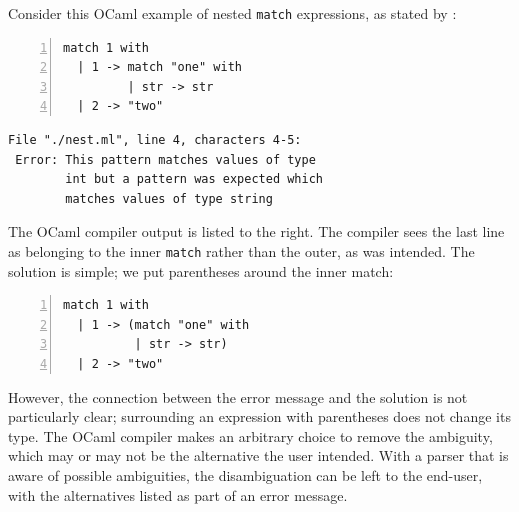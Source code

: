 \documentclass[runningheads]{llncs}
\newcommand{\ocaml}{\lstinline[language={[objective]caml}]}
\begin{document}
Consider this OCaml example of nested \verb|match| expressions, as stated by \cite{palmkvistCreatingDomainSpecificLanguages2019}:

\begin{minipage}{.34\textwidth}
\begin{lstlisting}[language={[objective]caml},numbers=left,basicstyle=\small\tt]
match 1 with
  | 1 -> match "one" with
         | str -> str
  | 2 -> "two"
\end{lstlisting}
\end{minipage}
\vrule
\begin{minipage}{\textwidth}
\begin{lstlisting}[basicstyle=\small\tt]
 File "./nest.ml", line 4, characters 4-5:
 Error: This pattern matches values of type
        int but a pattern was expected which
        matches values of type string
\end{lstlisting}
\end{minipage}


\noindent The OCaml compiler output is listed to the right. The compiler sees the last line as belonging to the inner \ocaml{match} rather than the outer, as was intended. The solution is simple; we put parentheses around the inner match:

\begin{minipage}{\textwidth}
\begin{lstlisting}[language={[objective]caml},numbers=left,basicstyle=\small\tt]
match 1 with
  | 1 -> (match "one" with
          | str -> str)
  | 2 -> "two"
\end{lstlisting}
\end{minipage}

\noindent However, the connection between the error message and the solution is not particularly clear; surrounding an expression with parentheses does not change its type.
%
%
%
%
%
%
The OCaml compiler makes an arbitrary choice to remove the ambiguity, which may or may not be the alternative the user intended. With a parser that is aware of possible ambiguities, the disambiguation can be left to the end-user, with the alternatives listed as part of an error message.
\end{document}

